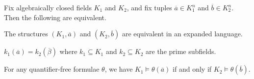 \documentclass[../notes.tex]{subfiles}
\begin{document}
\begin{corollary}
	Fix algebraically closed fields $K_1$ and $K_2$, and fix tuples $\overline a\in K_1^n$ and $\overline b\in K_2^n$. Then the following are equivalent.
	\begin{listalph}
		\item The structures $(K_1,\overline a)$ and $(K_2,\overline b)$ are equivalent in an expanded language.
		\item $k_1(\overline a)=k_2(\overline\beta)$ where $k_1\subseteq K_1$ and $k_2\subseteq K_2$ are the prime subfields.
		\item For any quantifier-free formulae $\theta$, we have $K_1\models\theta(\overline a)$ if and only if $K_2\models\theta(\overline b)$.
	\end{listalph}
\end{corollary}
\end{document}
